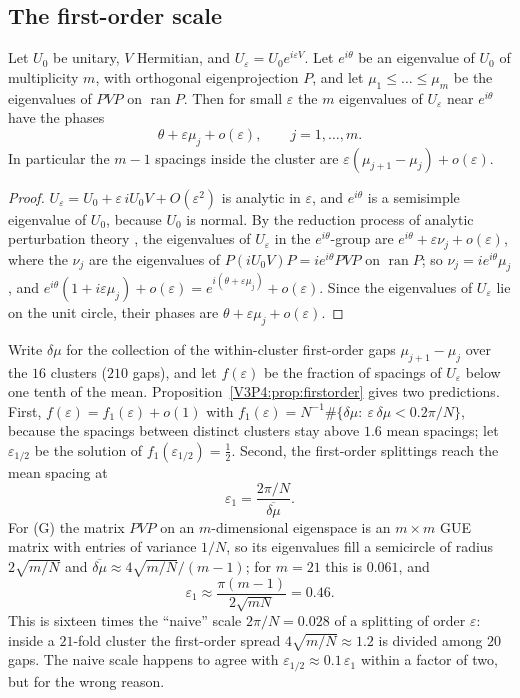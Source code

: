 \subsection*{The first-order scale}

\begin{proposition}\label{V3P4:prop:firstorder}
Let $U_0$ be unitary, $V$ Hermitian, and $U_\varepsilon=U_0e^{i\varepsilon V}$. Let $e^{i\theta}$ be
an eigenvalue of $U_0$ of multiplicity $m$, with orthogonal eigenprojection $P$, and let
$\mu_1\le\dots\le\mu_m$ be the eigenvalues of $PVP$ on $\operatorname{ran}P$. Then for small
$\varepsilon$ the $m$ eigenvalues of $U_\varepsilon$ near $e^{i\theta}$ have the phases
\[
\theta+\varepsilon\mu_j+o(\varepsilon),\qquad j=1,\dots,m .
\]
In particular the $m-1$ spacings inside the cluster are $\varepsilon(\mu_{j+1}-\mu_j)+o(\varepsilon)$.
\end{proposition}

\begin{proof}
$U_\varepsilon=U_0+\varepsilon\,iU_0V+O(\varepsilon^{2})$ is analytic in $\varepsilon$, and
$e^{i\theta}$ is a semisimple eigenvalue of $U_0$, because $U_0$ is normal. By the reduction
process of analytic perturbation theory \cite{Kato}, the eigenvalues of $U_\varepsilon$ in the
$e^{i\theta}$-group are $e^{i\theta}+\varepsilon\nu_j+o(\varepsilon)$, where the $\nu_j$ are the
eigenvalues of $P(iU_0V)P=ie^{i\theta}PVP$ on $\operatorname{ran}P$; so $\nu_j=ie^{i\theta}\mu_j$,
and $e^{i\theta}(1+i\varepsilon\mu_j)+o(\varepsilon)=e^{i(\theta+\varepsilon\mu_j)}+o(\varepsilon)$.
Since the eigenvalues of $U_\varepsilon$ lie on the unit circle, their phases are
$\theta+\varepsilon\mu_j+o(\varepsilon)$.
\end{proof}

Write $\delta\mu$ for the collection of the within-cluster first-order gaps $\mu_{j+1}-\mu_j$ over
the $16$ clusters ($210$ gaps), and let $f(\varepsilon)$ be the fraction of spacings of
$U_\varepsilon$ below one tenth of the mean. Proposition~\ref{V3P4:prop:firstorder} gives two
predictions. First, $f(\varepsilon)=f_1(\varepsilon)+o(1)$ with
$f_1(\varepsilon)=N^{-1}\#\{\delta\mu:\ \varepsilon\,\delta\mu<0.2\pi/N\}$, because the spacings
between distinct clusters stay above $1.6$ mean spacings; let $\varepsilon_{1/2}$ be the solution
of $f_1(\varepsilon_{1/2})=\tfrac12$. Second, the first-order splittings reach the mean spacing at
\[
\varepsilon_1=\frac{2\pi/N}{\overline{\delta\mu}}.
\]
For (G) the matrix $PVP$ on an $m$-dimensional eigenspace is an $m\times m$ GUE matrix with entries
of variance $1/N$, so its eigenvalues fill a semicircle of radius $2\sqrt{m/N}$ and
$\overline{\delta\mu}\approx4\sqrt{m/N}/(m-1)$; for $m=21$ this is $0.061$, and
\[
\varepsilon_1\approx\frac{\pi(m-1)}{2\sqrt{mN}}=0.46 .
\]
This is sixteen times the ``naive'' scale $2\pi/N=0.028$ of a splitting of order $\varepsilon$:
inside a $21$-fold cluster the first-order spread $4\sqrt{m/N}\approx1.2$ is divided among $20$
gaps. The naive scale happens to agree with $\varepsilon_{1/2}\approx0.1\,\varepsilon_1$ within a
factor of two, but for the wrong reason.

